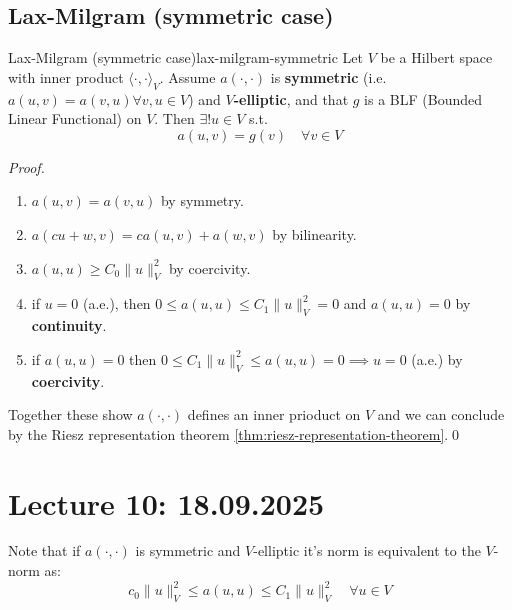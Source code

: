 \subsection{Lax-Milgram (symmetric case)}
\begin{theorem}{Lax-Milgram (symmetric case)}{lax-milgram-symmetric}
    Let $V$ be a Hilbert space with inner product $\langle \cdot, \cdot \rangle_V$.
    Assume $a(\cdot, \cdot)$ is \textbf{symmetric} (i.e. $a(u, v) = a(v, u) \forall v,u \in V$) and \textbf{$V$-elliptic}, and that $g$ is a BLF (Bounded Linear Functional) on $V$.
    Then $\exists! u \in V$ s.t.
    \[
        a(u, v) = g(v) \quad \forall v \in V
    \]

\end{theorem}
\begin{proof}
    \begin{enumerate}
        \item $a(u, v) = a(v, u)$ by symmetry.
        \item $a(cu + w, v) = c a(u, v) + a(w, v)$ by bilinearity.
        \item $a(u, u) \geq C_0 \|u\|_V^2$ by coercivity.
        \item if $u = 0$ (a.e.), then $0 \leq a(u, u) \leq C_1 \|u\|_V^2 = 0$ and $a(u, u) = 0$ by \textbf{continuity}.
        \item if $a(u, u) = 0$ then $0 \leq C_1 \|u\|_V^2 \leq a(u, u) = 0 \implies u = 0$ (a.e.) by \textbf{coercivity}.
    \end{enumerate}
    Together these show $a(\cdot, \cdot)$ defines an inner prioduct on $V$ and we can conclude by the Riesz representation theorem \ref{thm:riesz-representation-theorem}.\qed
\end{proof}

\section{Lecture 10: 18.09.2025}
Note that if $a(\cdot, \cdot)$ is symmetric and $V$-elliptic it's norm is equivalent to the $V$-norm as:
\[
    c_0 \|u\|_V^2 \leq a(u, u) \leq C_1 \|u\|_V^2 \quad \forall u \in V
\]


